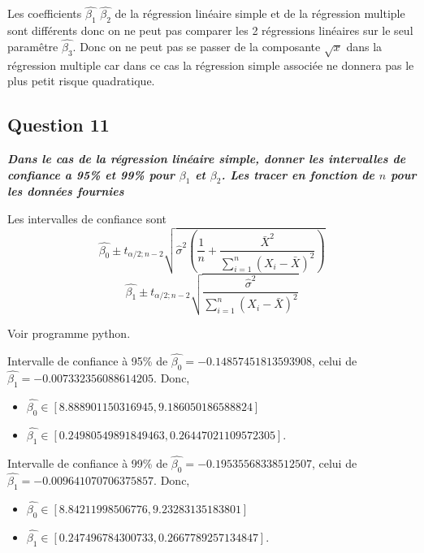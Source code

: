 \documentclass[pdflatex]{article}
\theoremstyle{definition}
\newcommand{\quest}[1]{\textbf{\textit{#1}} \vspace{3mm}}
\begin{document}

Les coefficients $\hat{\beta_1}$ $\hat{\beta_2}$ de la r\'egression lin\'eaire simple et de la r\'egression multiple sont diff\'erents donc on ne peut pas comparer les 2 r\'egressions lin\'eaires sur le seul param\^etre $\hat{\beta_3}$. Donc on ne peut pas se passer de la composante $\sqrt{x}$ dans la r\'egression multiple car dans ce cas la r\'egression simple associ\'ee ne donnera pas le plus petit risque quadratique.  


\subsection*{Question 11}
\quest{Dans le cas de la r\'egression lin\'eaire simple, donner les intervalles de confiance a 95\% et 99\% pour $\beta_1$ et $\beta_2$. Les tracer en fonction de $n$ pour les donn\'ees fournies}

Les intervalles de confiance sont 
$$
\hat{\beta_0} \pm t_{\alpha/2;n-2}\sqrt{\hat{\sigma}^2\left(\frac{1}{n}+\frac{\bar{X}^2}{\sum_{i=1}^{n}{(X_i-\bar{X})^2}}\right)}
$$
$$
\hat{\beta_1} \pm t_{\alpha/2;n-2}\sqrt{\frac{\hat{\sigma}^2}{\sum_{i=1}^{n}{(X_i-\bar{X})^2}}}
$$

Voir programme python.

Intervalle de confiance \`a 95\% de $\hat{\beta_0} = -0.14857451813593908$, celui de $\hat{\beta_1} = -0.007332356088614205$. Donc, 
\begin{itemize}
    \item $ \hat{\beta_0} \in [8.888901150316945, 9.186050186588824]$ 
    \item $\hat{\beta_1} \in [0.24980549891849463, 0.26447021109572305]$.
\end{itemize}

\vspace{5mm}
Intervalle de confiance \`a 99\% de $\hat{\beta_0} = -0.19535568338512507$, celui de $\hat{\beta_1} = -0.009641070706375857$. Donc,
\begin{itemize}
    \item $\hat{\beta_0} \in [8.84211998506776, 9.23283135183801]$
    \item $\hat{\beta_1} \in [0.247496784300733, 0.2667789257134847]$.
\end{itemize}
\end{document}
